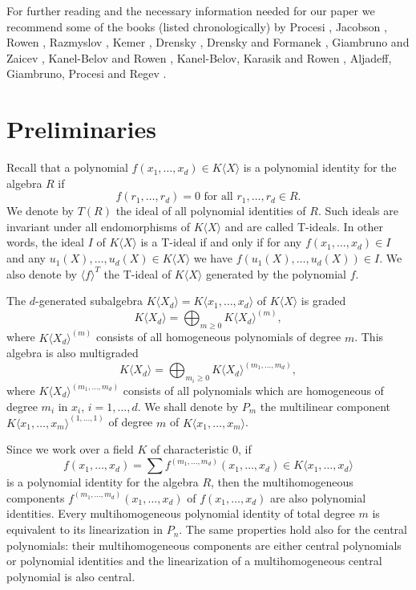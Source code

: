 \documentclass[12pt]{amsart}
\theoremstyle{definition}
\begin{document}
For further reading and the necessary information needed for our paper we recommend some of the books (listed chronologically)
by Procesi \cite{Pro}, Jacobson \cite{Ja}, Rowen \cite{Row1, Row2, Row3}, Razmyslov \cite{Raz2}, Kemer \cite{Kem}, Drensky \cite{Dr3}, Drensky and Formanek \cite{DrFo},
Giambruno and Zaicev \cite{GiZa}, Kanel-Belov and Rowen \cite{K-BRow}, Kanel-Belov, Karasik and Rowen \cite{K-BRowKar},
Aljadeff, Giambruno, Procesi and Regev \cite{AlGiProReg}.

\section{Preliminaries}
Recall that a polynomial $f(x_1,\ldots,x_d)\in K\langle X\rangle$ is a polynomial identity for the algebra $R$ if
\[
f(r_1,\ldots,r_d)=0\text{ for all }r_1,\ldots,r_d\in R.
\]
We denote by $T(R)$ the ideal of all polynomial identities of $R$. Such ideals are invariant under all endomorphisms of $K\langle X\rangle$ and are called T-ideals.
In other words, the ideal $I$ of $K\langle X\rangle$ is a T-ideal if and only if for any $f(x_1,\ldots,x_d)\in I$ and any $u_1(X),\ldots,u_d(X)\in K\langle X\rangle$
we have $f(u_1(X),\ldots,u_d(X))\in I$. We also denote by $\langle f\rangle^T$ the T-ideal of $K\langle X\rangle$ generated by the polynomial $f$.

The $d$-generated subalgebra $K\langle X_d\rangle=K\langle x_1,\ldots,x_d\rangle$ of $K\langle X\rangle$ is graded
\[
K\langle X_d\rangle=\bigoplus_{m\geq 0}K\langle X_d\rangle^{(m)},
\]
where $K\langle X_d\rangle^{(m)}$ consists of all homogeneous polynomials of degree $m$.
This algebra is also multigraded
\[
K\langle X_d\rangle=\bigoplus_{m_i\geq 0}K\langle X_d\rangle^{(m_1,\ldots,m_d)},
\]
where $K\langle X_d\rangle^{(m_1,\ldots,m_d)}$ consists of all polynomials which are homogeneous of degree $m_i$ in $x_i$, $i=1,\ldots,d$.
We shall denote by $P_m$ the multilinear component $K\langle x_1,\ldots,x_m\rangle^{(1,\ldots,1)}$ of degree $m$ of $K\langle x_1,\ldots,x_m\rangle$.

Since we work over a field $K$ of characteristic 0, if
\[
f(x_1,\ldots,x_d)=\sum f^{(m_1,\ldots,m_d)}(x_1,\ldots,x_d)\in K\langle x_1,\ldots,x_d\rangle
\]
is a polynomial identity for the algebra $R$, then the multihomogeneous components $f^{(m_1,\ldots,m_d)}(x_1,\ldots,x_d)$ of $f(x_1,\ldots,x_d)$ are also
polynomial identities. Every multihomogeneous polynomial identity of total degree $m$ is equivalent to its linearization in $P_n$.
The same properties hold also for the central polynomials: their multihomogeneous components are either central polynomials or polynomial identities
and the linearization of a multihomogeneous central polynomial is also central.
\end{document}
